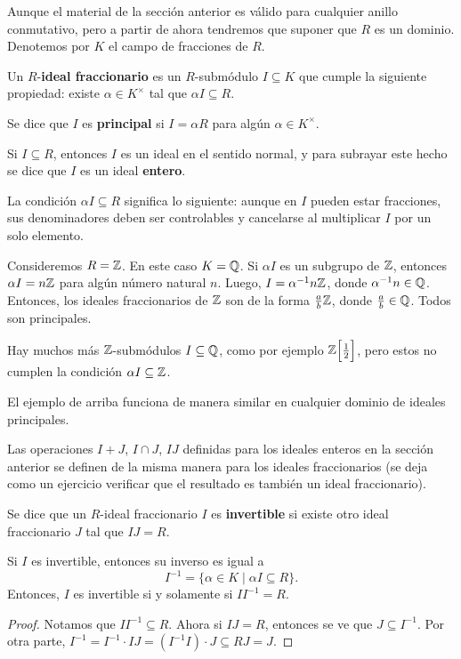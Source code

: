 Aunque el material de la sección anterior es válido para cualquier anillo
conmutativo, pero a partir de ahora tendremos que suponer que $R$ es
un dominio. Denotemos por $K$ el campo de fracciones de $R$.

\begin{definicion}
  Un $R$-\textbf{ideal fraccionario} es un $R$-submódulo $I \subseteq K$
  que cumple la siguiente propiedad: existe $\alpha \in K^\times$ tal que
  $\alpha I \subseteq R$.

  Se dice que $I$ es \textbf{principal} si $I = \alpha R$ para algún
  $\alpha \in K^\times$.

  Si $I \subseteq R$, entonces $I$ es un ideal en el sentido normal, y para
  subrayar este hecho se dice que $I$ es un ideal \textbf{entero}.
\end{definicion}

La condición $\alpha I \subseteq R$ significa lo siguiente: aunque en $I$ pueden
estar fracciones, sus denominadores deben ser controlables y cancelarse
al multiplicar $I$ por un solo elemento.

\begin{ejemplo}
  Consideremos $R = \mathbb{Z}$. En este caso $K = \mathbb{Q}$. Si $\alpha I$ es un subgrupo
  de $\mathbb{Z}$, entonces $\alpha I = n\mathbb{Z}$ para algún número natural $n$. Luego,
  $I = \alpha^{-1} n \mathbb{Z}$, donde $\alpha^{-1} n \in \mathbb{Q}$. Entonces, los ideales
  fraccionarios de $\mathbb{Z}$ son de la forma $\frac{a}{b} \mathbb{Z}$, donde
  $\frac{a}{b} \in \mathbb{Q}$. Todos son principales.

  Hay muchos más $\mathbb{Z}$-submódulos $I \subseteq \mathbb{Q}$, como por ejemplo
  $\mathbb{Z} \Bigl[\frac{1}{2}\Bigr]$, pero estos no cumplen la condición
  $\alpha I \subseteq \mathbb{Z}$.
\end{ejemplo}

El ejemplo de arriba funciona de manera similar en cualquier dominio de ideales
principales.

Las operaciones $I + J$, $I \cap J$, $IJ$ definidas para los ideales enteros
en la sección anterior se definen de la misma manera para los ideales
fraccionarios (se deja como un ejercicio verificar que el resultado es también
un ideal fraccionario).

\begin{definicion}
  Se dice que un $R$-ideal fraccionario $I$ es \textbf{invertible} si existe
  otro ideal fraccionario $J$ tal que $IJ = R$.
\end{definicion}

\begin{proposicion}
    Si $I$ es invertible, entonces su inverso es igual a
    $$I^{-1} = \{ \alpha \in K \mid \alpha I \subseteq R \}.$$
    Entonces, $I$ es invertible si y solamente si $I I^{-1} = R$.

    \begin{proof}
      Notamos que $II^{-1} \subseteq R$. Ahora si $IJ = R$, entonces se ve que
      $J \subseteq I^{-1}$. Por otra parte,
      $I^{-1} = I^{-1}\cdot IJ = (I^{-1} I)\cdot J \subseteq RJ = J$.
    \end{proof}
\end{proposicion}

